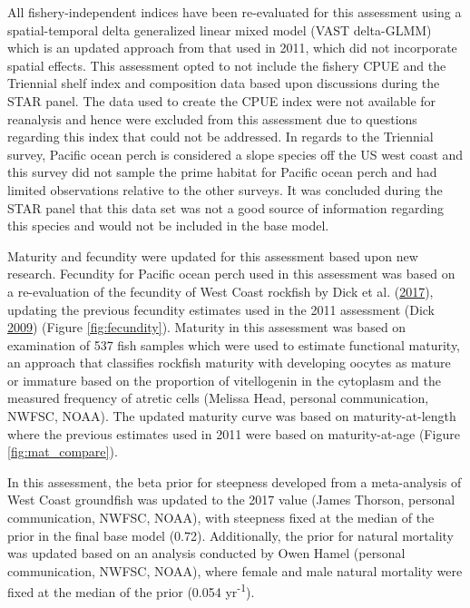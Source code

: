 \documentclass[12pt,]{article}
\begin{document}
All fishery-independent indices have been re-evaluated for this
assessment using a spatial-temporal delta generalized linear mixed model
(VAST delta-GLMM) which is an updated approach from that used in 2011,
which did not incorporate spatial effects. This assessment opted to not
include the fishery CPUE and the Triennial shelf index and composition
data based upon discussions during the STAR panel. The data used to
create the CPUE index were not available for reanalysis and hence were
excluded from this assessment due to questions regarding this index that
could not be addressed. In regards to the Triennial survey, Pacific
ocean perch is considered a slope species off the US west coast and this
survey did not sample the prime habitat for Pacific ocean perch and had
limited observations relative to the other surveys. It was concluded
during the STAR panel that this data set was not a good source of
information regarding this species and would not be included in the base
model.

Maturity and fecundity were updated for this assessment based upon new
research. Fecundity for Pacific ocean perch used in this assessment was
based on a re-evaluation of the fecundity of West Coast rockfish by Dick
et al. (\protect\hyperlink{ref-dick_meta-analysis_2017}{2017}), updating
the previous fecundity estimates used in the 2011 assessment (Dick
\protect\hyperlink{ref-dick_modeling_2009}{2009}) (Figure
\ref{fig:fecundity}). Maturity in this assessment was based on
examination of 537 fish samples which were used to estimate functional
maturity, an approach that classifies rockfish maturity with developing
oocytes as mature or immature based on the proportion of vitellogenin in
the cytoplasm and the measured frequency of atretic cells (Melissa Head,
personal communication, NWFSC, NOAA). The updated maturity curve was
based on maturity-at-length where the previous estimates used in 2011
were based on maturity-at-age (Figure \ref{fig:mat_compare}).

In this assessment, the beta prior for steepness developed from a
meta-analysis of West Coast groundfish was updated to the 2017 value
(James Thorson, personal communication, NWFSC, NOAA), with steepness
fixed at the median of the prior in the final base model (0.72).
Additionally, the prior for natural mortality was updated based on an
analysis conducted by Owen Hamel (personal communication, NWFSC, NOAA),
where female and male natural mortality were fixed at the median of the
prior (0.054 yr\textsuperscript{-1}).
\end{document}
